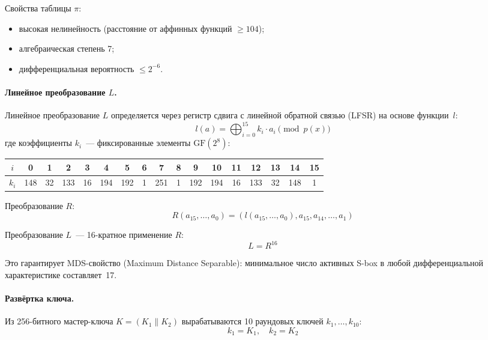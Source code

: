 \documentclass[a4paper,14pt]{extarticle}
\begin{document}
Свойства таблицы $\pi$:
\begin{itemize}
    \item высокая нелинейность (расстояние от аффинных функций $\geq 104$);
    \item алгебраическая степень 7;
    \item дифференциальная вероятность $\leq 2^{-6}$.
\end{itemize}

\paragraph{Линейное преобразование $L$.}

Линейное преобразование $L$ определяется через регистр сдвига с линейной обратной связью (LFSR) на основе функции~$l$:
\begin{equation}
    l(a) = \bigoplus_{i=0}^{15} k_i \cdot a_i \pmod{p(x)}
\end{equation}
где коэффициенты $k_i$~--- фиксированные элементы $\mathrm{GF}(2^8)$:

\begin{table}[h]
\centering
\small
\begin{tabular}{@{}c|cccccccccccccccc@{}}
\toprule
$i$ & 0 & 1 & 2 & 3 & 4 & 5 & 6 & 7 & 8 & 9 & 10 & 11 & 12 & 13 & 14 & 15 \\
\midrule
$k_i$ & 148 & 32 & 133 & 16 & 194 & 192 & 1 & 251 & 1 & 192 & 194 & 16 & 133 & 32 & 148 & 1 \\
\bottomrule
\end{tabular}
\end{table}

Преобразование $R$:
\begin{equation}
    R(a_{15}, \ldots, a_0) = (l(a_{15}, \ldots, a_0), a_{15}, a_{14}, \ldots, a_1)
\end{equation}

Преобразование $L$~--- 16-кратное применение $R$:
\begin{equation}
    L = R^{16}
\end{equation}

Это гарантирует MDS-свойство (Maximum Distance Separable): минимальное число активных S-box в любой дифференциальной характеристике составляет~17.

\paragraph{Развёртка ключа.}

Из 256-битного мастер-ключа $K = (K_1 \| K_2)$ вырабатываются 10 раундовых ключей $k_1, \ldots, k_{10}$:
\begin{equation}
    k_1 = K_1, \quad k_2 = K_2
\end{equation}
\end{document}
